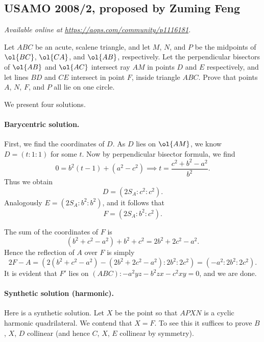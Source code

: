 \documentclass[11pt]{scrartcl}
\begin{document}
\subsection{USAMO 2008/2, proposed by Zuming Feng}
\textsl{Available online at \url{https://aops.com/community/p1116181}.}
\begin{mdframed}[style=mdpurplebox,frametitle={Problem statement}]
Let $ABC$ be an acute, scalene triangle,
and let $M$, $N$, and $P$ be the midpoints of
$\ol{BC}$, $\ol{CA}$, and $\ol{AB}$, respectively.
Let the perpendicular bisectors of $\ol{AB}$ and $\ol{AC}$
intersect ray $AM$ in points $D$ and $E$ respectively,
and let lines $BD$ and $CE$ intersect in point $F$, inside triangle $ABC$.
Prove that points $A$, $N$, $F$, and $P$ all lie on one circle.
\end{mdframed}
We present four solutions.

\paragraph{Barycentric solution.}
First, we find the coordinates of $D$.
As $D$ lies on $\ol{AM}$, we know $D=(t:1:1)$ for some $t$.
Now by perpendicular bisector formula, we find
\[ 0 = b^2(t-1) + (a^2-c^2) \implies t = \frac{c^2+b^2-a^2}{b^2}. \]
Thus we obtain \[ D = \left( 2S_A : c^2 : c^2 \right). \]
Analogously $E = (2S_A : b^2 : b^2)$,
and it follows that \[ F = \left( 2S_A : b^2 : c^2 \right). \]

The sum of the coordinates of $F$ is
\[ (b^2+c^2-a^2)+b^2+c^2=  2b^2+2c^2-a^2. \]
Hence the reflection of $A$ over $F$ is simply
\[ 2F-A = \left( 2(b^2+c^2-a^2)-(2b^2+2c^2-a^2) : 2b^2 : 2c^2 \right)
  = \left(-a^2 : 2b^2 : 2c^2 \right). \]
It is evident that $F'$ lies on $(ABC) : -a^2yz - b^2zx - c^2xy = 0$,
and we are done.

\paragraph{Synthetic solution (harmonic).}
Here is a synthetic solution.
Let $X$ be the point so that $APXN$ is a cyclic harmonic quadrilateral.
We contend that $X = F$.
To see this it suffices to prove $B$, $X$, $D$ collinear
(and hence $C$, $X$, $E$ collinear by symmetry).
\end{document}
